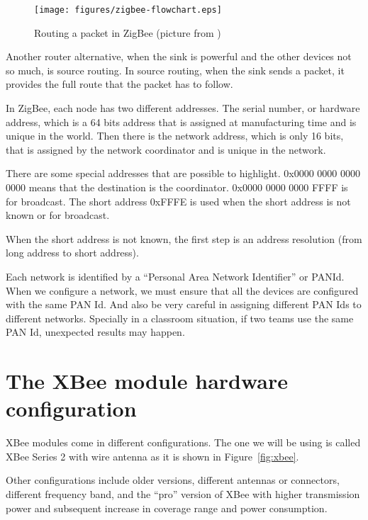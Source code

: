 \begin{figure}[htbp]
  \centering
  \texttt{[image: figures/zigbee-flowchart.eps]}
  \caption{Routing a packet in ZigBee (picture from \cite{baronti2007wsn})}
  \label{fig:zigbee-flowchart}
\end{figure}

Another router alternative, when the sink is powerful and the other devices not so much, is source routing.
In source routing, when the sink sends a packet, it provides the full route that the packet has to follow.

In ZigBee, each node has two different addresses.
The serial number, or hardware address, which is a 64 bits address that is assigned at manufacturing time and is unique in the world.
Then there is the network address, which is only 16 bits, that is assigned by the network coordinator and is unique in the network.

There are some special addresses that are possible to highlight.
0x0000 0000 0000 0000 means that the destination is the coordinator.
0x0000 0000 0000 FFFF is for broadcast.
The short address 0xFFFE is used when the short address is not known or for broadcast.

When the short address is not known, the first step is an address resolution (from long address to short address).

Each network is identified by a ``Personal Area Network Identifier'' or PANId.
When we configure a network, we must ensure that all the devices are configured with the same PAN Id. 
And also be very careful in assigning different PAN Ids to different networks.
Specially in a classroom situation, if two teams use the same PAN Id, unexpected results may happen.


\section{The XBee module hardware configuration}\label{xbee:hardware}

XBee modules come in different configurations. The one we will be using is called XBee Series 2 with wire antenna as it is shown in Figure~\ref{fig:xbee}.

Other configurations include older versions, different antennas or connectors, different frequency band, and the ``pro'' version of XBee with higher transmission power and subsequent increase in coverage range and power consumption.


